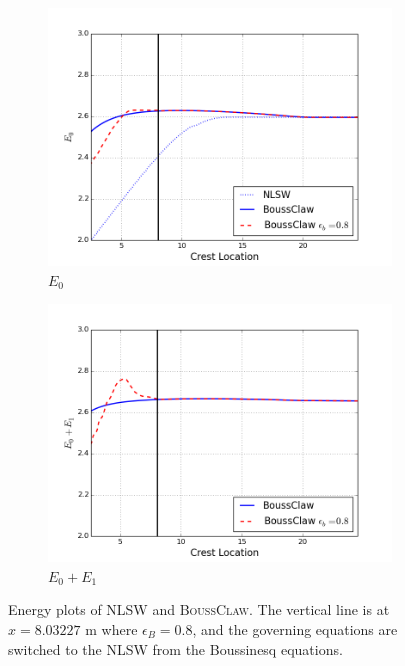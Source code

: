 \documentclass[review]{elsarticle}
\begin{document}
\begin{figure}[!htb]
    \centering
    \begin{subfigure}[b]{0.45\textwidth}
        \includegraphics[width=\textwidth]{_fig/e0_boussclaw_eb08.png}
        \caption{$E_0$}
        \label{fig:e0_boussclaw_eb08}
    \end{subfigure}
    \begin{subfigure}[b]{0.45\textwidth}
        \includegraphics[width=\textwidth]{_fig/e1_boussclaw_eb08.png}
        \caption{$E_0+E_1$}
        \label{fig:e1_boussclaw_eb08}
    \end{subfigure}
    \caption{Energy plots of NLSW and \textsc{BoussClaw}.
    The vertical line is at $x=8.03227$ m where $\epsilon_B=0.8$,
    and the governing equations are switched to the NLSW from
    the Boussinesq equations. }
    \label{fig:energy_boussclaw_swe}
\end{figure}
\end{document}
